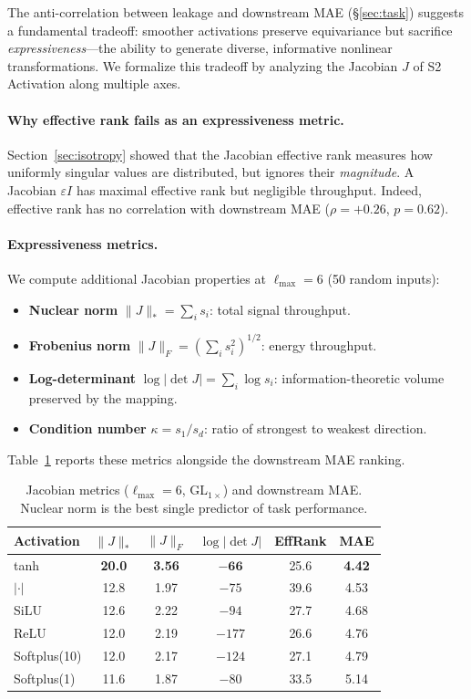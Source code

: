 \documentclass[10pt,twocolumn]{article}
\begin{document}
The anti-correlation between leakage and downstream MAE (\S\ref{sec:task}) suggests a
fundamental tradeoff: smoother activations preserve equivariance but sacrifice
\emph{expressiveness}---the ability to generate diverse, informative nonlinear
transformations. We formalize this tradeoff by analyzing the Jacobian $J$ of S2 Activation
along multiple axes.

\paragraph{Why effective rank fails as an expressiveness metric.}
Section~\ref{sec:isotropy} showed that the Jacobian effective rank measures how uniformly
singular values are distributed, but ignores their \emph{magnitude}. A Jacobian
$\varepsilon I$ has maximal effective rank but negligible throughput. Indeed, effective rank
has no correlation with downstream MAE ($\rho = +0.26$, $p = 0.62$).

\paragraph{Expressiveness metrics.}
We compute additional Jacobian properties at $\ell_{\max}{=}6$ (50 random inputs):

\begin{itemize}
  \item \textbf{Nuclear norm} $\|J\|_* = \sum_i s_i$: total signal throughput.
  \item \textbf{Frobenius norm} $\|J\|_F = (\sum_i s_i^2)^{1/2}$: energy throughput.
  \item \textbf{Log-determinant} $\log|\det J| = \sum_i \log s_i$: information-theoretic
    volume preserved by the mapping.
  \item \textbf{Condition number} $\kappa = s_1/s_d$: ratio of strongest to weakest
    direction.
\end{itemize}

Table~\ref{tab:jacobian} reports these metrics alongside the downstream MAE ranking.

\begin{table}[t]
  \caption{Jacobian metrics ($\ell_{\max}{=}6$, GL$_{1\times}$) and downstream MAE.
  Nuclear norm is the best single predictor of task performance.}
  \label{tab:jacobian}
  \centering
  \small
  \begin{tabular}{lccccc}
    \toprule
    Activation & $\|J\|_*$ & $\|J\|_F$ & $\log|\det J|$ & EffRank & MAE \\
    \midrule
    tanh       & \textbf{20.0} & \textbf{3.56} & $\mathbf{-66}$ & 25.6 & \textbf{4.42} \\
    $|\cdot|$  & 12.8 & 1.97 & $-75$ & 39.6 & 4.53 \\
    SiLU       & 12.6 & 2.22 & $-94$ & 27.7 & 4.68 \\
    ReLU       & 12.0 & 2.19 & $-177$ & 26.6 & 4.76 \\
    Softplus(10) & 12.0 & 2.17 & $-124$ & 27.1 & 4.79 \\
    Softplus(1) & 11.6 & 1.87 & $-80$ & 33.5 & 5.14 \\
    \bottomrule
  \end{tabular}
\end{table}
\end{document}
